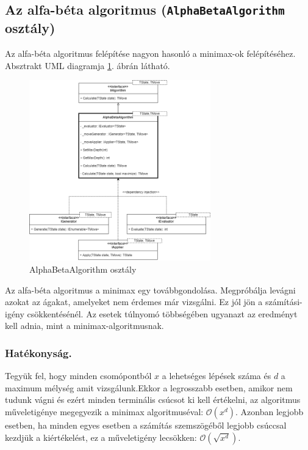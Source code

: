 \documentclass[twoside, a4paper, 12pt]{book}
\begin{document}
\subsection{Az alfa-béta algoritmus (\texttt{AlphaBetaAlgorithm} osztály)}
Az alfa-béta algoritmus felépítése nagyon hasonló a minimax-ok felépítéséhez. Absztrakt UML diagramja \ref{fig:alphaBetaAbstractDiagram}. ábrán látható.

\begin{figure}[htbp]
	\centering
	\includegraphics[width=0.7\textwidth]{img/alphabetaAbstractDiagram.png}
	\caption{AlphaBetaAlgorithm osztály}
	\label{fig:alphaBetaAbstractDiagram}
\end{figure}
Az alfa-béta algoritmus a minimax egy továbbgondolása. Megpróbálja levágni azokat az ágakat, amelyeket nem érdemes már vizsgálni. Ez jól jön a számítási-igény csökkentésénél. Az esetek túlnyomó többségében ugyanazt az eredményt kell adnia, mint a minimax-algoritmusnak.

\subsubsection*{Hatékonyság.} Tegyük fel, hogy minden csomópontból $x$ a lehetséges lépések száma és $d$ a maximum mélység amit vizsgálunk.Ekkor a legrosszabb esetben, amikor nem tudunk vágni és ezért minden terminális csúcsot ki kell értékelni, az algoritmus műveletigénye megegyezik a minimax algoritmuséval: $ \mathcal{O}(x^d)$.
Azonban legjobb esetben, ha minden egyes esetben a számítás szemszögéből legjobb csúccsal kezdjük a kiértékelést, ez a műveletigény lecsökken: $\mathcal{O}(\sqrt{x^d})$.\cite{alfaBetaPruneHu}
\end{document}
